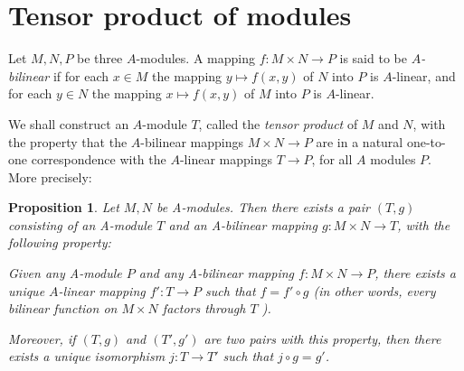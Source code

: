 \documentclass{standalone}
\newtheorem{proposition}[theorem]{Proposition}
\theoremstyle{definition}
\theoremstyle{remark}
\begin{document}
\section{Tensor product of modules}
Let $M, N, P$ be three $A$-modules. A mapping $f\colon M \times N \to P$ is said to
be {\itshape $A$-bilinear} if for each $x \in M$ the mapping $y \mapsto f(x, y)$ of $N$
into $P$ is $A$-linear, and for each $y \in N$ the mapping $x \mapsto f(x, y)$
of $M$ into $P$ is $A$-linear.

We shall construct an $A$-module $T$, called the {\itshape tensor
  product} of $M$ and $N$, with the property that the $A$-bilinear
mappings $M \times N \to P$ are in a natural one-to-one correspondence
with the $A$-linear mappings $T \to P$, for all $A$ modules $P$. More
precisely:
\begin{proposition}
  \label{prop:2.12}
  Let $M, N$ be A-modules. Then there exists a pair $(T, g)$
consisting of an A-module $T$ and an A-bilinear mapping $g: M \times N \to T$,
with the following property:

Given any A-module $P$ and any A-bilinear mapping $f: M \times N \to P$, there
exists a unique $A$-linear mapping $f'\colon T \to P$ such that $f=f' \circ g$ (in
other words, every bilinear function on $M \times N$ factors through $T$ ).

Moreover, if $(T, g)$ and $(T', g')$ are two pairs with this
property, then there exists a unique isomorphism $j\colon T \to T'$ such that
$j \circ g=g'$.
\end{proposition}
\end{document}

